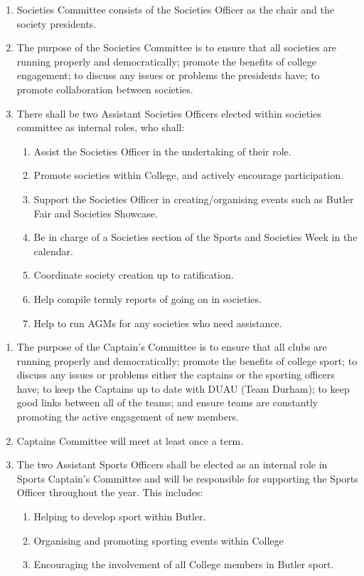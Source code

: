 \begin{enumerate}
    \item Societies Committee consists of the Societies Officer as the chair and the society presidents.
    \item The purpose of the Societies Committee is to ensure that all societies are running properly and democratically; promote the benefits of college engagement; to discuss any issues or problems the presidents have; to promote collaboration between societies.
    \item There shall be two Assistant Societies Officers elected within societies committee as internal roles, who shall:
    \begin{enumerate}
        \item Assist the Societies Officer in the undertaking of their role.
        \item Promote societies within College, and actively encourage participation.
        \item Support the Societies Officer in creating/organising events such as Butler Fair and Societies Showcase.
        \item Be in charge of a Societies section of the Sports and Societies Week in the calendar.
        \item Coordinate society creation up to ratification. \item Help compile termly reports of going on in societies. 
        \item Help to run AGMs for any societies who need assistance.
    \end{enumerate}
\end{enumerate}



\begin{enumerate}
    \item The purpose of the Captain’s Committee is to ensure that all clubs are running properly and democratically; promote the benefits of college sport; to discuss any issues or problems either the captains or the sporting officers have; to keep the Captains up to date with DUAU (Team Durham); to keep good links between all of the teams; and ensure teams are constantly promoting the active engagement of new members.
    \item Captains Committee will meet at least once a term.
    \item The two Assistant Sports Officers shall be elected as an internal role in Sports Captain’s Committee and will be responsible for supporting the Sports Officer throughout the year. This includes:
    \begin{enumerate}
        \item Helping to develop sport within Butler.
        \item Organising and promoting sporting events within College
        \item Encouraging the involvement of all College members in Butler sport.
    \end{enumerate}

\end{enumerate}


